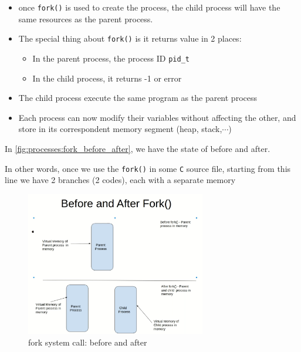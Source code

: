 \documentclass[12pt,a4paper]{book}
\begin{document}
\begin{itemize}

\item once \verb|fork()| is used to create the process, the child process will have the same resources as the parent process.

\item The special thing about \verb|fork()| is it returns value in 2 places:

    \begin{itemize}
        \item In the parent process, the process ID \verb|pid_t|

        \item In the child process, it returns -1 or error
        
    \end{itemize}

\item The child process execute the same program as the parent process

\item Each process can now modify their variables without affecting the other, and store in its correspondent memory segment (heap, stack,$\cdots$) 

\end{itemize}


In \autoref{fig:processes:fork_before_after}, we have the state of before and after. 

In other words, once we use the \verb|fork()| in some \verb|C| source file, starting from this line we have 2 branches (2 codes), each with a separate memory

\begin{figure}[h]
\centering
\includegraphics[width = 0.7\textwidth, frame]{Figures/processes/fork_before_after}
\caption{fork system call: before and after}
\label{fig:processes:fork_before_after}
\end{figure}
\end{document}
